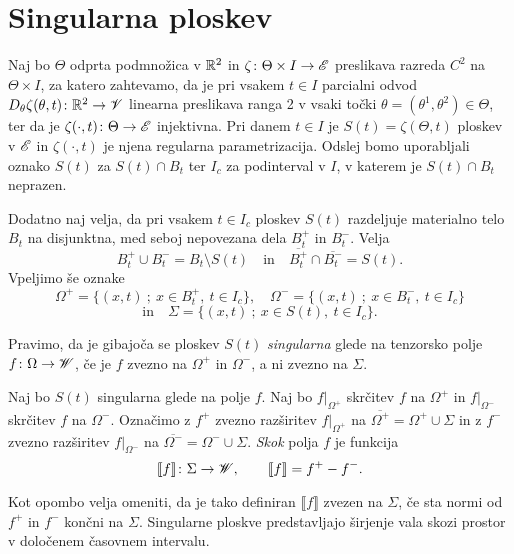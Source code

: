 \section{Singularna ploskev}


Naj bo $\Theta$ odprta podmnožica v $\mathbb R^2$ in $\zeta\colon\Theta\times I\to\mathscr E$ preslikava
razreda $C^2$ na $\Theta\times I$, za katero zahtevamo, da je pri vsakem $t\in I$ parcialni
odvod $D_{\theta}\zeta(\theta,t)\colon\mathbb R^2\to\mathscr V$ linearna preslikava ranga 2
v vsaki točki $\theta=(\theta^1,\theta^2)\in\Theta$, ter da je $\zeta(\cdot,t)\colon\Theta\to\mathscr E$
injektivna. Pri danem $t\in I$ je $S(t)=\zeta(\Theta, t)$ ploskev
v $\mathscr E$ in $\zeta(\cdot, t)$ je njena regularna parametrizacija. Odslej bomo uporabljali
oznako $S(t)$ za $S(t)\cap B_t$ ter $I_c$ za podinterval v $I$, v katerem je $S(t)\cap B_t$ neprazen.

Dodatno naj velja, da pri vsakem $t\in I_c$ ploskev $S(t)$ razdeljuje materialno telo $B_t$
na disjunktna, med seboj nepovezana dela $B_t^+$ in $B_t^-$. Velja
\[ B_t^+\cup B_t^- = B_t\setminus S(t)\quad\mathrm{in}\quad \overline{B_t^+}\cap \overline{B_t^-}=S(t). \]
Vpeljimo še oznake
\[ \Omega^+=\{(x, t)\: ; \: x\in B_t^+,\ t\in I_c\},\quad\Omega^-=\{(x, t)\: ; \: x\in B_t^-,\ t\in I_c\} \]
\begin{equation*} \textrm{in}\quad\Sigma = \{(x, t)\: ; \: x\in S(t),\ t\in I_c\}. \end{equation*}

\begin{definicija}
	Pravimo, da je gibajoča se ploskev $S(t)$ \emph{singularna} glede na tenzorsko polje
	$f\colon\Omega\to\mathscr W$, če je $f$ zvezno na $\Omega^+$ in $\Omega^-$, a ni zvezno na $\Sigma$.
\end{definicija}
\begin{definicija}
	Naj bo $S(t)$ singularna glede na polje $f$. Naj bo $f|_{\Omega^+}$
	skrčitev $f$ na $\Omega^+$ in $f|_{\Omega^-}$ skrčitev $f$ na $\Omega^-$. Označimo z
	$f^+$ zvezno razširitev $f|_{\Omega^+}$ na $\overline{\Omega^+}=\Omega^+\cup\Sigma$ in z
	$f^-$ zvezno razširitev $f|_{\Omega^-}$ na $\overline{\Omega^-}=\Omega^-\cup\Sigma$. \emph{Skok} polja $f$
	je funkcija
	\[ \llbracket f\rrbracket\colon\Sigma\to\mathscr W,\qquad \llbracket f\rrbracket=f^+-f^-. \]
\end{definicija}
Kot opombo velja omeniti, da je tako definiran $\llbracket f\rrbracket$ zvezen na $\Sigma$,
če sta normi od $f^+$ in $f^-$ končni na $\Sigma$.
Singularne ploskve predstavljajo širjenje vala skozi prostor v določenem časovnem intervalu.

